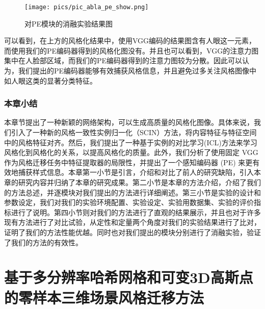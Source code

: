 \begin{figure}[htb]
    \centering
    \texttt{[image: pics/pic\_abla\_pe\_show.png]}
    \caption{\label{fig:pic_abla_pe}对PE模块的消融实验结果图}
\end{figure}可以看到，在上方的风格化结果中，使用VGG编码的结果图含有人眼这一元素，而使用我们的PE编码器得到的风格化图没有。并且也可以看到，VGG的注意力图集中在人脸部区域，而我们的PE编码器得到的注意力图较为分散。因此可以认为，我们提出的PE编码器能够有效捕获风格信息，并且避免过多关注风格图像中如人眼这类的显著分类特征。
\subsection{本章小结}
本章节提出了一种新颖的网络架构，可以生成高质量的风格化图像。具体来说，我们引入了一种新的风格一致性实例归一化（SCIN）方法，将内容特征与特征空间中的风格特征对齐。然后，我们提出了一种基于实例的对比学习(ICL)方法来学习风格化到风格化的关系，以提高风格化的质量。此外，我们分析了使用固定 VGG 作为风格迁移任务中特征提取器的局限性，并提出了一个感知编码器 (PE) 来更有效地捕获样式信息。本章第一小节是引言，介绍和对比了前人的研究缺陷，引入本章的研究内容并归纳了本章的研究成果。第二小节是本章的方法介绍，介绍了我们的方法总述，并逐模块对我们提出的方法进行详细阐述。第三小节是实验的设计和参数设定，我们对我们的实验环境配置、实验设定、实验用数据集、实验的评价指标进行了说明。第四小节则对我们的方法进行了直观的结果展示，并且也对于许多现有方法进行了对比试验，从定性和定量两个角度对我们的实验结果进行了比对，证明了我们的方法性能优越。同时也对我们提出的模块分别进行了消融实验，验证了我们的方法的有效性。


\chapter{基于多分辨率哈希网格和可变3D高斯点的零样本三维场景风格迁移方法}
